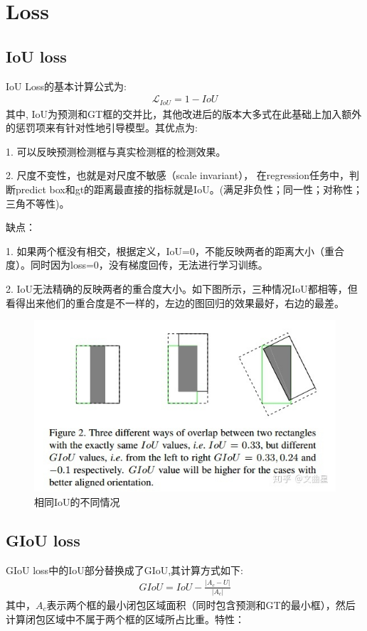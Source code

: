 \documentclass{article}
\begin{document}
\section{Loss}
\subsection{IoU loss}
IoU Loss的基本计算公式为:
\begin{align}
\mathcal{L}_{IoU} = 1 - IoU
\end{align}
其中, IoU为预测和GT框的交并比，其他改进后的版本大多式在此基础上加入额外的惩罚项来有针对性地引导模型。其优点为:

1. 可以反映预测检测框与真实检测框的检测效果。

2. 尺度不变性，也就是对尺度不敏感（scale invariant）， 在regression任务中，判断predict box和gt的距离最直接的指标就是IoU。(满足非负性；同一性；对称性；三角不等性)。

缺点：

1. 如果两个框没有相交，根据定义，IoU=0，不能反映两者的距离大小（重合度）。同时因为loss=0，没有梯度回传，无法进行学习训练。

2. IoU无法精确的反映两者的重合度大小。如下图所示，三种情况IoU都相等，但看得出来他们的重合度是不一样的，左边的图回归的效果最好，右边的最差。
\begin{figure}[htp]
\centering
\includegraphics[scale=0.5]{images/IoU.jpg}
\caption{相同IoU的不同情况}
\label{Fig.IoU}
\end{figure}

\subsection{GIoU loss}
GIoU loss中的IoU部分替换成了GIoU,其计算方式如下:
\begin{align}
GIoU = IoU - \frac{\left| A_c - U \right|}{\left| A_c \right|}
\end{align}
其中，$A_c$表示两个框的最小闭包区域面积（同时包含预测和GT的最小框），然后计算闭包区域中不属于两个框的区域所占比重。特性：
\end{document}
